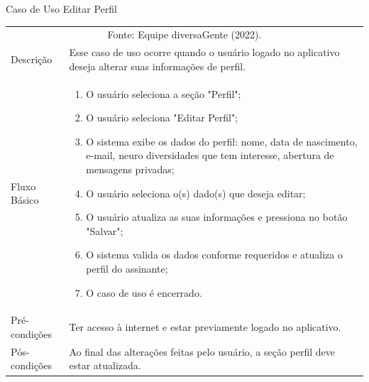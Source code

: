 \documentclass[
    12pt,               %
    openright,          %
    oneside,
    a4paper,            %
    paginasA3,  %
    BIBLATEX,           %
    REFINDENT,          %
    MODELO,             %
    TODO,               %
    english,            %
    brazil              %
    ]{ifsp-spo-inf-ctds} %
\providecommand{\DIFadd}[1]{{\protect\color{blue}\uwave{#1}}} %
\providecommand{\DIFaddbegin}{} %
\providecommand{\DIFaddend}{} %
\providecommand{\DIFdelbegin}{} %
\providecommand{\DIFdelend}{} %
\begin{document}
\begin{apendicesenv}
\begin{itemize}
	\DIFaddbegin \end{itemize}

	
	\DIFaddend \begin{quadro}[htb]
		\centering
		\ABNTEXfontereduzida
		\DIFdelbegin %
\DIFdelend \caption[Caso de Uso Editar Perfil]{Caso de Uso Editar Perfil}
		\DIFaddbegin \label{casos-de-uso3}
	\DIFaddend \end{quadro}	
	\DIFdelbegin %

\DIFdelend \begin{longtable}{|p{3.3cm}|p{12.3cm}|}
		\hline
		\thead{} & \thead{Ator} \\
		\hline
		\DIFaddbegin 

		\endfirsthead
		\multicolumn{2}{c}{\scriptsize Fonte: Equipe diversaGente (2022).}%
		{{ \autoref{casos-de-uso3} \DIFadd{continued from previous page}}} \\
		\endhead

		\DIFaddend Descrição & Esse caso de uso ocorre quando o usuário logado no aplicativo deseja alterar suas informações de perfil.\\
		\hline
		Fluxo Básico  &
		\begin{enumerate}
			\item O usuário seleciona a seção "Perfil";
			\item O usuário seleciona "Editar Perfil";
			\item O sistema exibe os dados do perfil: nome, data de nascimento, e-mail, neuro diversidades que tem interesse, abertura de mensagens privadas;
			\item O usuário seleciona o(s) dado(s) que deseja editar;
			\item O usuário atualiza as suas informações e pressiona no botão "Salvar";
			\item O sistema valida os dados conforme requeridos e atualiza o perfil do assinante;
			\item O caso de uso é encerrado. 
		\end{enumerate}\\
		\hline
		Pré-condições & Ter acesso à internet e estar previamente logado no aplicativo.\\
		\hline
		Pós-condições & Ao final das alterações feitas pelo usuário, a seção perfil deve estar atualizada.\\
		\hline
	\end{longtable}
	\DIFaddbegin {}
	\DIFaddend 


\end{apendicesenv}
\end{document}

